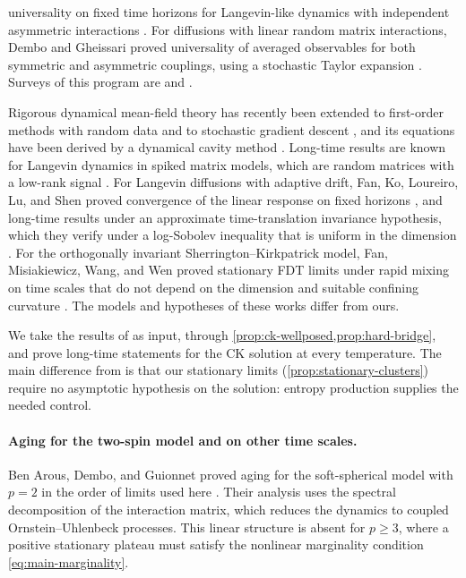 universality on fixed time horizons for Langevin-like dynamics with independent asymmetric interactions \cite[Theorem~1.1]{dlz2021}. For diffusions with linear random matrix interactions, Dembo and Gheissari proved universality of averaged observables for both symmetric and asymmetric couplings, using a stochastic Taylor expansion \cite[Theorem~1 and Corollary~3]{dembogheissari2021}. Surveys of this program are \cite{ba2002} and \cite[pp.~117--121]{guionnet2007}.

Rigorous dynamical mean-field theory has recently been extended to first-order methods with random data \cite{ccm2021} and to stochastic gradient descent \cite{gerbelot2024}, and its equations have been derived by a dynamical cavity method \cite{dandi2026}. Long-time results are known for Langevin dynamics in spiked matrix models, which are random matrices with a low-rank signal \cite{lss2023}. For Langevin diffusions with adaptive drift, Fan, Ko, Loureiro, Lu, and Shen proved convergence of the linear response on fixed horizons \cite{fan2025a}, and long-time results under an approximate time-translation invariance hypothesis, which they verify under a log-Sobolev inequality that is uniform in the dimension \cite[Theorems~2.5 and~2.9]{fan2025b}. For the orthogonally invariant Sherrington--Kirkpatrick model, Fan, Misiakiewicz, Wang, and Wen proved stationary FDT limits under rapid mixing on time scales that do not depend on the dimension and suitable confining curvature \cite[Lemma~4.1]{fan2026}. The models and hypotheses of these works differ from ours.

We take the results of \cite{bag2006,dgm2007,sellke2024} as input, through \cref{prop:ck-wellposed,prop:hard-bridge}, and prove long-time statements for the CK solution at every temperature. The main difference from \cite[Proposition~6.1]{dgm2007} is that our stationary limits (\cref{prop:stationary-clusters}) require no asymptotic hypothesis on the solution: entropy production supplies the needed control.

\paragraph{Aging for the two-spin model and on other time scales.}
Ben Arous, Dembo, and Guionnet proved aging for the soft-spherical model with $p=2$ in the order of limits used here \cite{bag2001}. Their analysis uses the spectral decomposition of the interaction matrix, which reduces the dynamics to coupled Ornstein--Uhlenbeck processes. This linear structure is absent for $p\ge3$, where a positive stationary plateau must satisfy the nonlinear marginality condition \eqref{eq:main-marginality}.

